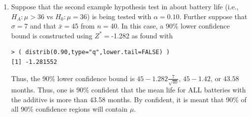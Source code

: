 \documentclass[10pt,openany]{book}\usepackage[]{graphicx}\usepackage[]{color}
\makeatletter
\newenvironment{kframe}{%
 \def\at@end@of@kframe{}%
 \ifinner\ifhmode%
  \def\at@end@of@kframe{\end{minipage}}%
  \begin{minipage}{\columnwidth}%
 \fi\fi%
 \def\FrameCommand##1{\hskip\@totalleftmargin \hskip-\fboxsep
 \colorbox{shadecolor}{##1}\hskip-\fboxsep
     \hskip-\linewidth \hskip-\@totalleftmargin \hskip\columnwidth}%
 \MakeFramed {\advance\hsize-\width
   \@totalleftmargin\z@ \linewidth\hsize
   \@setminipage}}%
 {\par\unskip\endMakeFramed%
 \at@end@of@kframe}
\newenvironment{knitrout}{}{} %
\makeatother
\begin{document}
\begin{enumerate}
  \item Suppose that the second example hypothesis test in  about battery life (i.e., $H_{A}:\mu>36$ vs $H_{0}:\mu=36$) is being tested with $\alpha=0.10$. Further suppose that $\sigma=$7 and that $\bar{x}=$45 from $n=$40. In this case, a 90\% lower confidence bound is constructed using $Z^{*}=$-1.282 as found with
\begin{knitrout}
\color{fgcolor}\begin{kframe}
\begin{verbatim}
> ( distrib(0.90,type="q",lower.tail=FALSE) )
[1] -1.281552
\end{verbatim}
\end{kframe}
\end{knitrout}
Thus, the 90\% lower confidence bound is $45-1.282\frac{7}{\sqrt{40}}$, $45-1.42$, or $43.58$ months.  Thus, one is 90\% confident that the mean life for ALL batteries with the additive is more than 43.58 months.  By confident, it is meant that 90\% of all 90\% confidence regions will contain $\mu$.
\end{enumerate}
\end{document}
